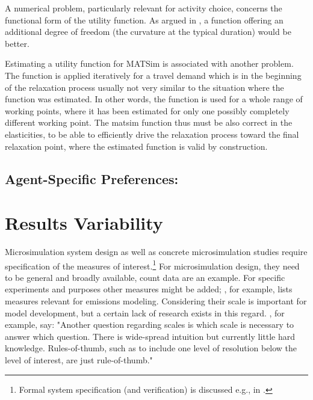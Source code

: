{A numerical problem, particularly relevant for activity choice, concerns the functional form of the utility function. As argued in \citet[][p.33]{MATSim_Userguide_2014}, a function offering an additional degree of freedom (the curvature at the typical duration) would be better.

Estimating a utility function for MATSim is associated with another problem. The function is applied iteratively for a travel demand which is in the beginning of the relaxation process usually not very similar to the situation where the function was estimated. In other words, the function is used for a whole range of working points, where it has been estimated for only one  possibly completely different working point. The \gls{matsim} function thus must be also correct in the elasticities, to be able to efficiently drive the relaxation process toward the final relaxation point, where the estimated function is valid by construction. 
}

\subsection{Agent-Specific Preferences:}
\label{sec:agent-specific-prefs}



\vfill\eject
\section{Results Variability}
\label{sec:variability}
Microsimulation system design as well as concrete microsimulation studies require specification of the measures  of interest.\footnote{%
Formal system specification (and verification) is discussed e.g., in \citet[][]{FisherWooldridge_IJCIS_1997, BourahlaBenmohamed_ENTCS_2005}. 
} For microsimulation design, they need to be general and broadly available, count data are an example. For specific experiments and purposes other measures might be added; \citet[][]{Kitamura_TMIP_1996}, for example, lists measures relevant for emissions modeling. Considering their scale is important for model development, but a certain lack of research exists in this regard. \citet[][Section 2.2]{NagelAxhausen200Xiatbr00-report}, for example, say: "Another question regarding scales is which scale is necessary to answer which question. There is wide-spread intuition but currently little hard knowledge. Rules-of-thumb, such as to include one level of resolution below the level of interest, are just rule-of-thumb." 

